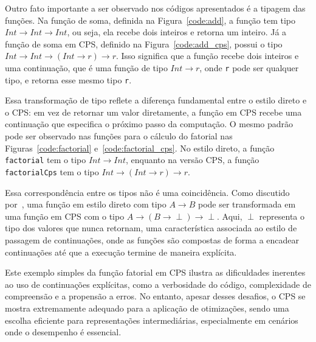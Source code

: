 Outro fato importante a ser observado nos códigos apresentados é a tipagem das funções.
Na função de soma, definida na Figura~\ref{code:add}, a função tem tipo $Int \rightarrow Int \rightarrow Int$, ou seja, ela recebe dois inteiros e retorna um inteiro.
Já a função de soma em CPS, definido na Figura~\ref{code:add_cps}, possui o tipo $Int \rightarrow Int \rightarrow (Int \rightarrow r) \rightarrow r$. Isso significa que a função recebe dois inteiros e uma continuação, que é uma função de tipo $Int \rightarrow r$, onde \texttt{r} pode ser qualquer tipo, e retorna esse mesmo tipo \texttt{r}.

Essa transformação de tipo reflete a diferença fundamental entre o estilo direto e o CPS\@: em vez de retornar um valor diretamente, a função em CPS recebe uma continuação que especifica o próximo passo da computação.
O mesmo padrão pode ser observado nas funções para o cálculo do fatorial nas Figuras~\ref{code:factorial} e~\ref{code:factorial_cps}.
No estilo direto, a função \texttt{factorial} tem o tipo $Int \rightarrow Int$, enquanto na versão CPS, a função \texttt{factorialCps} tem o tipo $Int \rightarrow (Int \rightarrow r) \rightarrow r$.

Essa correspondência entre os tipos não é uma coincidência.
Como discutido por~\cite{torrens2019calculo}, uma função em estilo direto com tipo $A \rightarrow B$ pode ser transformada em uma função em CPS com o tipo $A \rightarrow (B \rightarrow \perp) \rightarrow \perp$.
Aqui, $\perp$ representa o tipo dos valores que nunca retornam, uma característica associada ao estilo de passagem de continuações, onde as funções são compostas de forma a encadear continuações até que a execução termine de maneira explícita.

Este exemplo simples da função fatorial em CPS ilustra as dificuldades inerentes ao uso de continuações explícitas, como a verbosidade do código, complexidade de compreensão e a propensão a erros.
No entanto, apesar desses desafios, o CPS se mostra extremamente adequado para a aplicação de otimizações, sendo uma escolha eficiente para representações intermediárias, especialmente em cenários onde o desempenho é essencial.
